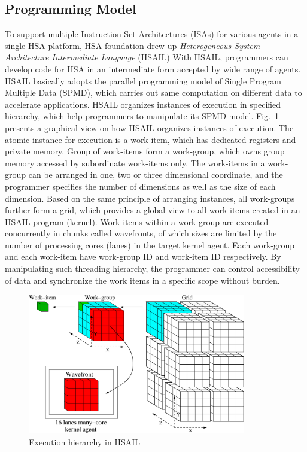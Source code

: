         \subsection{Programming Model}
        To support multiple Instruction Set Architectures (ISAs) for various agents in a single HSA platform,
        HSA foundation drew up \textit{Heterogeneous System Architecture Intermediate Language} (HSAIL)
        With HSAIL, programmers can develop code for HSA in an intermediate form accepted by wide range of agents.
        HSAIL basically adopts the parallel programming model of Single Program Multiple Data (SPMD), 
        which carries out same computation on different data to accelerate applications.
        HSAIL organizes instances of execution in specified hierarchy, which help programmers to manipulate its SPMD model.
        Fig.~\ref{fig:grid} presents a graphical view on how HSAIL organizes instances of execution.
        The atomic instance for execution is a work-item, which has dedicated registers and private memory.
        Group of work-items form a work-group, which owns group memory accessed by subordinate work-items only.
        The work-items in a work-group can be arranged in one, two or three dimensional coordinate, 
        and the programmer specifies the number of dimensions as well as the size of each dimension.
        Based on the same principle of arranging instances, all work-groups further form a grid, 
        which provides a global view to all work-items created in an HSAIL program (kernel).
        Work-items within a work-group are executed concurrently in chunks called wavefronts, 
        of which sizes are limited by the number of processing cores (lanes) in the target kernel agent.
        Each work-group and each work-item have work-group ID and work-item ID respectively.
        By manipulating such threading hierarchy, 
        the programmer can control accessibility of data and synchronize the work items in a specific scope without burden.
        \vspace{\textfig}
        \begin{figure}[!ht] 
            \centering
            \includegraphics[width=0.85\textwidth]{./figs/grid.eps}
            \caption{Execution hierarchy in HSAIL}
            \label{fig:grid}
        \end{figure}

